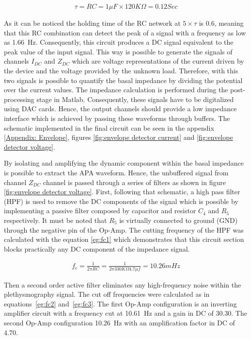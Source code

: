 \begin{align}
\tau = RC = 1 \mu F \times 120K\Omega = 0.12 Sec
\end{align}

As it can be noticed the holding time of the RC network at $5\times\tau$ is \SI{0.6}{\sec}, meaning that this RC combination can detect the peak of a signal with a frequency as low as \SI{1.66}{\Hz}. Consequently, this circuit produces a DC signal equivalent to the peak value of the input signal. This way is possible to generate the signals of channels $I_{DC}$ and $Z_{DC}$ which are voltage representations of the current driven by the device and the voltage provided by the unknown load. Therefore, with this two signals is possible to quantify the basal impedance by dividing the potential over the current values. The impedance calculation is performed during the post-processing stage in Matlab. Consequently, these signals have to be digitalized using DAC cards. Hence, the output channels should provide a low impedance interface which is achieved by passing these waveforms through buffers. The schematic implemented in the final circuit can be seen in the appendix \ref{Appendix: Envelope}, figures \ref{fig:envelope detector current} and \ref{fig:envelope detector voltage}.

By isolating and amplifying the dynamic component within the basal impedance is possible to extract the APA waveform. Hence, the unbuffered signal from channel $Z_{DC}$ channel is passed through a series of filters as shown in figure \ref{fig:envelope detector voltage}. First, following that schematic, a high pass filter (HPF) is used to remove the DC components of the signal which is possible by implementing a passive filter composed by capacitor and resistor  $C_4$ and $R_5$ respectively. It must be noted that $R_5$ is virtually connected to ground (GND) through the negative pin of the Op-Amp. The cutting frequency of the HPF was calculated with the equation \ref{eg:fc1} which demonstrates that this circuit section blocks practically any DC component of the impedance signal. 

\begin{align}
\label{eg:fc1}
f_c = \frac{1}{2 \pi R C} = \frac{1}{2 \pi 330K\Omega 4.7\mu f}=10.26 mHz
\end{align}

Then a second order active filter eliminates any high-frequency noise within the plethysmography signal. The cut off frequencies were calculated as in equations~\ref{eg:fc2} and~\ref{eg:fc3}. The first Op-Amp configuration is an inverting amplifier circuit with a frequency cut at \SI{10.61}{\Hz} and a gain in DC of \num{30.30}. The second Op-Amp configuration \SI{10.26}{\Hz} with an amplification factor in DC of \num{4.70}. 

